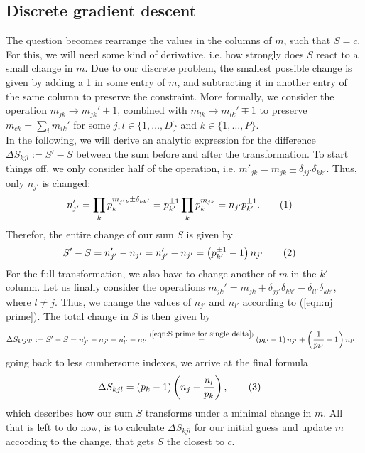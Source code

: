 \documentclass[english, parskip=full]{scrartcl}
\newcommand\numberthis{\addtocounter{equation}{1}\tag{\theequation}}
\newcommand{\kla}{}
\begin{document}
\subsection{Discrete gradient descent}
The question becomes rearrange the values in the columns of $m$, such that $S=c$. For this, we will need some kind of derivative, i.e. how strongly does $S$ react to a small change in $m$. Due to our discrete problem, the smallest possible change is given by adding a 1 in some entry of $m$, and subtracting it in another entry of the same column to preserve the constraint. More formally, we consider the operation $m_{jk}\rightarrow m_{jk}'\pm 1$, combined with $m_{lk}\rightarrow m_{lk}'\mp 1$ to preserve $m_{ck}=\sum_i m_{ik}'$ for some $j,l\in\{1,\dots,D\}$ and $k\in\{1,\dots,P\}$. \\
In the following, we will derive an analytic expression for the difference $\Delta S_{kjl}:=S'-S$ between the sum before and after the transformation. To start things off, we only consider half of the operation, i.e. $m'_{jk}=m_{jk}\pm \delta_{jj'}\delta_{kk'}$. Thus, only $n_{j'}$ is changed:
\begin{align*}
n_{j'}'&=\prod_kp_k^{m_{j'k}\pm\delta_{kk'}}=p_{k'}^{\pm 1}\prod_kp_k^{m_{jk}}=n_{j'}p_{k'}^{\pm 1}.\numberthis\label{eqn:nj prime}
\end{align*}
Therefor, the entire change of our sum $S$ is given by
\begin{align*}
S'-S&=n'_{j'}-n_{j'}=n_{j'}'-n_{j'}=\kla\left( {p_{k'}^{\pm 1} - 1} \right)n_{j'}\numberthis\label{eqn:S prime for single delta}
\end{align*}
For the full transformation, we also have to change another of $m$ in the $k'$ column. Let us finally consider the operations $m_{jk}'=m_{jk}+\delta_{jj'}\delta_{kk'}-\delta_{ll'}\delta_{kk'}$, where $l\neq j$. Thus, we change the values of $n_{j'}$ and $n_{l'}$ according to (\ref{eqn:nj prime}). The total change in $S$ is then given by 
\begin{align*}
\Delta S_{k'j'l'}&:=S'-S=n_{j'}'-n_{j'}+n_{l'}'-n_{l'}\overset{(\ref{eqn:S prime for single delta})}{=}\kla\left( {p_{k'}-1} \right)n_{j'}+\kla\left( {\frac{1}{p_{k'}}-1} \right)n_{l'}
\end{align*}
going back to less cumbersome indexes, we arrive at the final formula 
\begin{align*}
\Delta S_{kjl}&=(p_k-1)\kla\left( {n_j-\frac{n_l}{p_k}} \right),\numberthis\label{eqn:discrete derivative S kjl}
\end{align*}
which describes how our sum $S$ transforms under a minimal change in $m$. All that is left to do now, is to calculate $\Delta S_{kjl}$ for our initial guess and update $m$ according to the change, that gets $S$ the closest to $c$.
\end{document}
